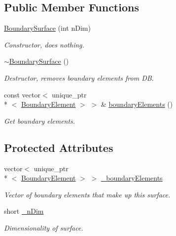 \subsection*{Public Member Functions}
\begin{DoxyCompactItemize}
\item 
\hyperlink{classBoundarySurface_a87739ff516e9c879943263440e2c837d}{Boundary\+Surface} (int n\+Dim)
\begin{DoxyCompactList}\small\item\em Constructor, does nothing. \end{DoxyCompactList}\item 
\hyperlink{classBoundarySurface_a15f38669a0a75aa5177e326090710907}{$\sim$\+Boundary\+Surface} ()
\begin{DoxyCompactList}\small\item\em Destructor, removes boundary elements from D\+B. \end{DoxyCompactList}\item 
const vector$<$ unique\+\_\+ptr\\*
$<$ \hyperlink{classBoundaryElement}{Boundary\+Element} $>$ $>$ \& \hyperlink{classBoundarySurface_a402dcf23f4f96110569d01e401edee5a}{boundary\+Elements} ()
\begin{DoxyCompactList}\small\item\em Get boundary elements. \end{DoxyCompactList}\end{DoxyCompactItemize}
\subsection*{Protected Attributes}
\begin{DoxyCompactItemize}
\item 
vector$<$ unique\+\_\+ptr\\*
$<$ \hyperlink{classBoundaryElement}{Boundary\+Element} $>$ $>$ \hyperlink{classBoundarySurface_a67f60b2d22fb67f097e98025803d3d34}{\+\_\+boundary\+Elements}
\begin{DoxyCompactList}\small\item\em Vector of boundary elements that make up this surface. \end{DoxyCompactList}\item 
short \hyperlink{classBoundarySurface_af3ed79310c6ba6cdc8e9f176bf463eb1}{\+\_\+n\+Dim}
\begin{DoxyCompactList}\small\item\em Dimensionality of surface. \end{DoxyCompactList}\end{DoxyCompactItemize}


